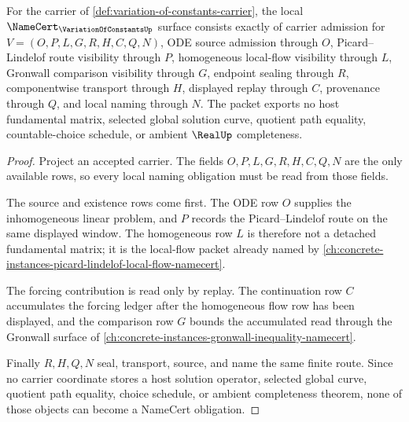 \begin{theorem}
\label{thm:variation-of-constants-namecert-obligations}
For the carrier of \autoref{def:variation-of-constants-carrier}, the local $\NameCert_{\VariationOfConstantsUp}$ surface consists exactly of carrier admission for $V=(O,P,L,G,R,H,C,Q,N)$, ODE source admission through $O$, Picard--Lindelof route visibility through $P$, homogeneous local-flow visibility through $L$, Gronwall comparison visibility through $G$, endpoint sealing through $R$, componentwise transport through $H$, displayed replay through $C$, provenance through $Q$, and local naming through $N$. The packet exports no host fundamental matrix, selected global solution curve, quotient path equality, countable-choice schedule, or ambient $\RealUp$ completeness.
\end{theorem}
\begin{proof}
Project an accepted carrier. The fields $O,P,L,G,R,H,C,Q,N$ are the only available rows, so every local naming obligation must be read from those fields.

The source and existence rows come first. The ODE row $O$ supplies the inhomogeneous linear problem, and $P$ records the Picard--Lindelof route on the same displayed window. The homogeneous row $L$ is therefore not a detached fundamental matrix; it is the local-flow packet already named by \autoref{ch:concrete-instances-picard-lindelof-local-flow-namecert}.

The forcing contribution is read only by replay. The continuation row $C$ accumulates the forcing ledger after the homogeneous flow row has been displayed, and the comparison row $G$ bounds the accumulated read through the Gronwall surface of \autoref{ch:concrete-instances-gronwall-inequality-namecert}.

Finally $R,H,Q,N$ seal, transport, source, and name the same finite route. Since no carrier coordinate stores a host solution operator, selected global curve, quotient path equality, choice schedule, or ambient completeness theorem, none of those objects can become a NameCert obligation.
\end{proof}

